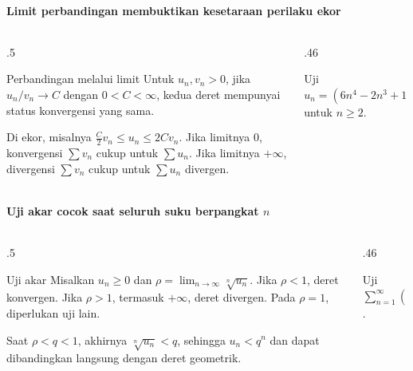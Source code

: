 \documentclass{../../kalkulus-ppt}
\begin{document}
\begin{frame}{\insertsection}
    \framesubtitle{Limit perbandingan membuktikan kesetaraan perilaku ekor}
    \begin{columns}[c,onlytextwidth]
        \begin{column}{.5\textwidth}
            \begin{block}{Perbandingan melalui limit}
                Untuk $u_n,v_n>0$, jika $u_n/v_n\to C$
                dengan $0<C<\infty$, kedua deret mempunyai
                status konvergensi yang sama.
            \end{block}
            Di ekor, misalnya $\frac C2v_n\le u_n\le 2Cv_n$.
            Jika limitnya $0$, konvergensi $\sum v_n$ cukup
            untuk $\sum u_n$. Jika limitnya $+\infty$,
            divergensi $\sum v_n$ cukup untuk $\sum u_n$ divergen.
        \end{column}
        \begin{column}{.46\textwidth}
            \begin{contoh}
                Uji $u_n=(6n^4-2n^3+1)/(n^5+n^2-2n)$
                untuk $n\ge2$.
            \end{contoh}
        \end{column}
    \end{columns}
\end{frame}

\begin{frame}{\insertsection}
    \framesubtitle{Uji akar cocok saat seluruh suku berpangkat $n$}
    \begin{columns}[c,onlytextwidth]
        \begin{column}{.5\textwidth}
            \begin{block}{Uji akar}
                Misalkan $u_n\ge0$ dan
                $\rho=\lim_{n\to\infty}\sqrt[n]{u_n}$.
                Jika $\rho<1$, deret konvergen. Jika $\rho>1$,
                termasuk $+\infty$, deret divergen.
                Pada $\rho=1$, diperlukan uji lain.
            \end{block}
            Saat $\rho<q<1$, akhirnya $\sqrt[n]{u_n}<q$,
            sehingga $u_n<q^n$ dan dapat dibandingkan
            langsung dengan deret geometrik.
        \end{column}
        \begin{column}{.46\textwidth}
            \begin{contoh}
                Uji $\displaystyle\sum_{n=1}^\infty
                    \left(\frac{n+2}{3n}\right)^n$.
            \end{contoh}
        \end{column}
    \end{columns}
\end{frame}
\end{document}
